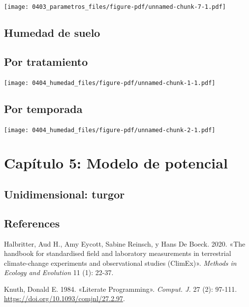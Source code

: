 \documentclass[
  letterpaper,
  DIV=11,
  numbers=noendperiod]{scrreprt}
\newlength{\cslhangindent}
\newenvironment{CSLReferences}[2] %
 {\begin{list}{}{%
  \setlength{\itemindent}{0pt}
  \setlength{\leftmargin}{0pt}
  \setlength{\parsep}{0pt}
  \ifodd #1
   \setlength{\leftmargin}{\cslhangindent}
   \setlength{\itemindent}{-1\cslhangindent}
  \fi
  \setlength{\itemsep}{#2\baselineskip}}}
 {\end{list}}
\begin{document}
\begin{center}
\texttt{[image: 0403\_parametros\_files/figure-pdf/unnamed-chunk-7-1.pdf]}
\end{center}

\chapter{Humedad de suelo}\label{humedad-de-suelo-1}

\chapter{Por tratamiento}

\begin{center}
\texttt{[image: 0404\_humedad\_files/figure-pdf/unnamed-chunk-1-1.pdf]}
\end{center}

\chapter{Por temporada}

\begin{center}
\texttt{[image: 0404\_humedad\_files/figure-pdf/unnamed-chunk-2-1.pdf]}
\end{center}

\part{Capítulo 5: Modelo de potencial}

\chapter{Unidimensional: turgor}\label{unidimensional-turgor}


\chapter*{References}\label{references}


\label{refs}
\begin{CSLReferences}{1}{0}
Halbritter, Aud H., Amy Eycott, Sabine Reinsch, y Hans De Boeck. 2020.
{«The handbook for standardised field and laboratory measurements in
terrestrial climate-change experiments and observational studies
(ClimEx)»}. \emph{Methods in Ecology and Evolution} 11 (1): 22-37.

Knuth, Donald E. 1984. {«Literate Programming»}. \emph{Comput. J.} 27
(2): 97-111. \url{https://doi.org/10.1093/comjnl/27.2.97}.

\end{CSLReferences}
\end{document}
